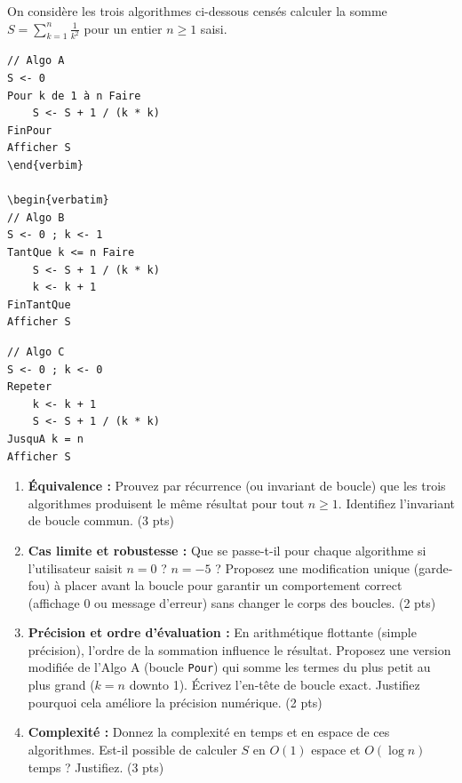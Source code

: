 \documentclass[11pt]{article}
\begin{document}
\begin{exercice}
On considère les trois algorithmes ci-dessous censés calculer la somme $S = \sum_{k=1}^{n} \frac{1}{k^2}$ pour un entier $n \ge 1$ saisi.

\begin{verbatim}
// Algo A
S <- 0
Pour k de 1 à n Faire
    S <- S + 1 / (k * k)
FinPour
Afficher S
\end{verbim}

\begin{verbatim}
// Algo B
S <- 0 ; k <- 1
TantQue k <= n Faire
    S <- S + 1 / (k * k)
    k <- k + 1
FinTantQue
Afficher S
\end{verbatim}

\begin{verbatim}
// Algo C
S <- 0 ; k <- 0
Repeter
    k <- k + 1
    S <- S + 1 / (k * k)
JusquA k = n
Afficher S
\end{verbatim}

\begin{enumerate}
    \item \textbf{Équivalence :} Prouvez par récurrence (ou invariant de boucle) que les trois algorithmes produisent le même résultat pour tout $n \ge 1$. Identifiez l'invariant de boucle commun. (3 pts)
    \item \textbf{Cas limite et robustesse :} Que se passe-t-il pour chaque algorithme si l'utilisateur saisit $n = 0$ ? $n = -5$ ? Proposez une modification unique (garde-fou) à placer avant la boucle pour garantir un comportement correct (affichage 0 ou message d'erreur) sans changer le corps des boucles. (2 pts)
    \item \textbf{Précision et ordre d'évaluation :} En arithmétique flottante (simple précision), l'ordre de la sommation influence le résultat. Proposez une version modifiée de l'Algo A (boucle \texttt{Pour}) qui somme les termes du plus petit au plus grand ($k=n$ downto 1). Écrivez l'en-tête de boucle exact. Justifiez pourquoi cela améliore la précision numérique. (2 pts)
    \item \textbf{Complexité :} Donnez la complexité en temps et en espace de ces algorithmes. Est-il possible de calculer $S$ en $O(1)$ espace et $O(\log n)$ temps ? Justifiez. (3 pts)
\end{enumerate}
\end{exercice}
\end{document}
